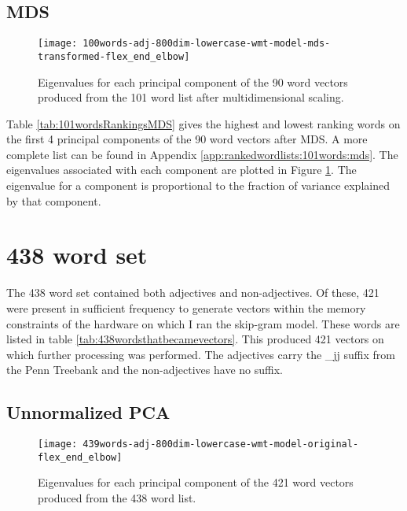 \subsection{MDS}



\begin{figure}[tbp]
    \texttt{[image: 100words-adj-800dim-lowercase-wmt-model-mds-transformed-flex\_end\_elbow]}
    \caption{Eigenvalues for each principal component of the 90 word vectors
    produced from the 101 word list after multidimensional scaling.}
    \label{fig:101wordsmdseigenvalues}
\end{figure}

Table \ref{tab:101wordsRankingsMDS} gives the highest and lowest
ranking words on the first 4 principal components of the 90 word 
vectors after MDS. A more complete list can be found in Appendix 
\ref{app:rankedwordlists:101words:mds}. The eigenvalues associated 
with each component are plotted in Figure 
\ref{fig:101wordsmdseigenvalues}. The eigenvalue for a component is
proportional to the fraction of variance explained by that component.


\section{438 word set}

The 438 word set contained both adjectives and non-adjectives. Of these, 421 
were present in sufficient frequency to generate vectors within the memory 
constraints of the hardware on which I ran the skip-gram model. These words are 
listed in table \ref{tab:438wordsthatbecamevectors}. This produced 421 vectors 
on which further processing was performed. The adjectives carry the \_jj suffix 
from the Penn Treebank \citep{Marcus1993} and the non-adjectives have 
no suffix.




\subsection{Unnormalized PCA}



\begin{figure}[tbp]
    \texttt{[image: 439words-adj-800dim-lowercase-wmt-model-original-flex\_end\_elbow]}
    \caption{Eigenvalues for each principal component of the 421 word vectors
    produced from the 438 word list.}
    \label{fig:438wordsunnormalizedpcaeigenvalues}
\end{figure}

